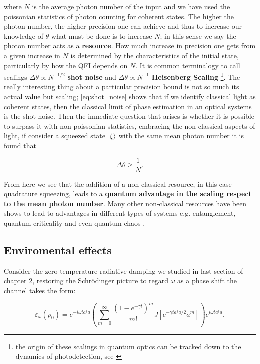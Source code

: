 where $N$ is the average photon number of the input and we have used the poissonian statistics of photon counting for coherent states. The
higher the photon number, the higher precision one can achieve and thus to
increase our knowledge of $\theta$ what must be done is to increase $N$; in this sense we say the photon number acts as a \textbf{resource}.
How much increase in precision one gets from a given increase in $N$ is determined by the characteristics of the initial state, particularly
by how the QFI depends on $N$. It is common terminalogy to call scalings $\Delta \theta \propto N^{-1/2}$ \textbf{shot noise} and  $\Delta \theta \propto N^{-1}$ \textbf{Heisenberg Scaling} \cite{barbieri_optical_2022} \footnote{the origin of these scalings in quantum optics can be tracked down to the dynamics of photodetection, see \cite{wiseman_quantum_2010}}. The really interesting thing about
a particular precision bound is not so much its actual value but scaling; \eqref{eq:shot_noise} shows that if we identify
classical light as coherent states, then the classical limit of phase estimation in an optical systems is the shot noise.
Then the inmediate question that arises is whether it is possible to surpass it with non-poissonian statistics, embracing the non-classical
aspects of light,  if consider a squeezed state $\ket{\xi}$ with the same mean photon number it is found \cite{barbieri_optical_2022} that

\begin{equation}
\Delta \theta \geq \frac{1}{N}.
\end{equation}

From here we see that the addition of a non-classical resource, in this case quadrature squeezing, leads to a \textbf{quantum advantage in
  the scaling respect to the mean photon number}. Many other non-classical resources have been shows to lead to advantages in different types
of systems e.g. entanglement, quantum criticality and even quantum chaos \cite{escher_general_2011, giovannetti_quantum_2006, jiao_quantum_2023}.
\subsection{Enviromental effects}
Consider the zero-temperature radiative damping we studied in last section of chapter 2, restoring the Schr{\"o}dinger picture to regard $\omega $ as a phase shift the channel takes the form:

\begin{equation}
  \varepsilon_{\omega}(\rho_{0}) = e^{-i\omega t a^{\dagger}a}\left(\sum_{m=0}^{\infty}\frac{(1-e^{-\gamma t})^{m}}{m!}J[e^{-\gamma t a^{\dagger}a/2}a^{m}]\right)e^{i\omega t a^{\dagger}a}.
\end{equation}

